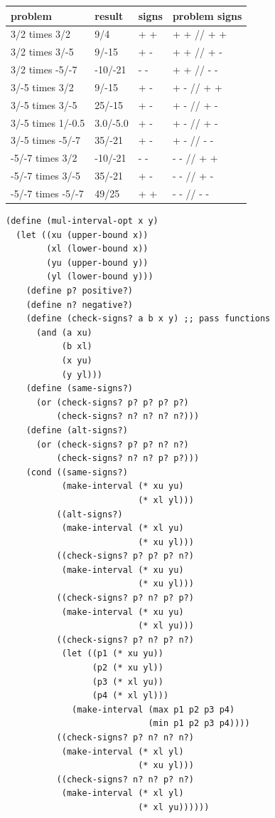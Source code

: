 \documentclass[final,fleqn,titlepage,twoside]{article}
\begin{document}
\begin{center}
\begin{tabular}{llll}
problem & result & signs & problem signs\\[0pt]
\hline
3/2 times 3/2 & 9/4 & + + & + + // + +\\[0pt]
3/2 times 3/-5 & 9/-15 & + - & + + // + -\\[0pt]
3/2 times -5/-7 & -10/-21 & - - & + + // - -\\[0pt]
3/-5 times 3/2 & 9/-15 & + - & + - // + +\\[0pt]
3/-5 times 3/-5 & 25/-15 & + - & + - // + -\\[0pt]
3/-5 times 1/-0.5 & 3.0/-5.0 & + - & + - // + -\\[0pt]
3/-5 times -5/-7 & 35/-21 & + - & + - // - -\\[0pt]
-5/-7 times 3/2 & -10/-21 & - - & - - // + +\\[0pt]
-5/-7 times 3/-5 & 35/-21 & + - & - - // + -\\[0pt]
-5/-7 times -5/-7 & 49/25 & + + & - - // - -\\[0pt]
\end{tabular}
\end{center}

\begin{verbatim}
(define (mul-interval-opt x y)
  (let ((xu (upper-bound x))
        (xl (lower-bound x))
        (yu (upper-bound y))
        (yl (lower-bound y)))
    (define p? positive?)
    (define n? negative?)
    (define (check-signs? a b x y) ;; pass functions
      (and (a xu)
           (b xl)
           (x yu)
           (y yl)))
    (define (same-signs?)
      (or (check-signs? p? p? p? p?)
          (check-signs? n? n? n? n?)))
    (define (alt-signs?)
      (or (check-signs? p? p? n? n?)
          (check-signs? n? n? p? p?)))
    (cond ((same-signs?)
           (make-interval (* xu yu)
                          (* xl yl)))
          ((alt-signs?)
           (make-interval (* xl yu)
                          (* xu yl)))
          ((check-signs? p? p? p? n?)
           (make-interval (* xu yu)
                          (* xu yl)))
          ((check-signs? p? n? p? p?)
           (make-interval (* xu yu)
                          (* xl yu)))
          ((check-signs? p? n? p? n?)
           (let ((p1 (* xu yu))
                 (p2 (* xu yl))
                 (p3 (* xl yu))
                 (p4 (* xl yl)))
             (make-interval (max p1 p2 p3 p4)
                            (min p1 p2 p3 p4))))
          ((check-signs? p? n? n? n?)
           (make-interval (* xl yl)
                          (* xu yl)))
          ((check-signs? n? n? p? n?)
           (make-interval (* xl yl)
                          (* xl yu))))))
\end{verbatim}
\end{document}
